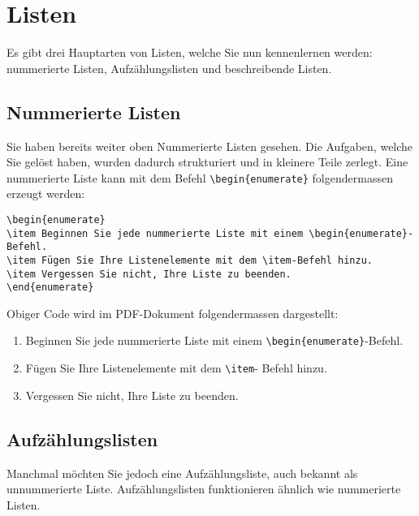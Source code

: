 \section{Listen}
Es gibt drei Hauptarten von Listen, welche Sie nun kennenlernen werden: nummerierte Listen, Aufzählungslisten und beschreibende Listen.

\subsection{Nummerierte Listen}
Sie haben bereits weiter oben Nummerierte Listen gesehen. Die Aufgaben, welche Sie gelöst haben, wurden dadurch strukturiert und in kleinere Teile zerlegt.
Eine nummerierte Liste kann mit dem Befehl \verb|\begin{enumerate}| folgendermassen erzeugt werden:
\begin{verbatim}
\begin{enumerate}
\item Beginnen Sie jede nummerierte Liste mit einem \begin{enumerate}-Befehl.
\item Fügen Sie Ihre Listenelemente mit dem \item-Befehl hinzu.
\item Vergessen Sie nicht, Ihre Liste zu beenden.
\end{enumerate}
\end{verbatim}
Obiger Code wird im PDF-Dokument folgendermassen dargestellt:
\begin{enumerate}
\item Beginnen Sie jede nummerierte Liste mit einem \verb|\begin{enumerate}|-Befehl.
\item Fügen Sie Ihre Listenelemente mit dem \verb|\item|- Befehl hinzu.
\item Vergessen Sie nicht, Ihre Liste zu beenden.
\end{enumerate}


\subsection{Aufzählungslisten}
Manchmal möchten Sie jedoch eine Aufzählungsliste, auch bekannt als unnummerierte Liste. Aufzählungslisten funktionieren ähnlich wie nummerierte Listen.

